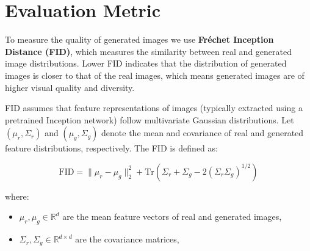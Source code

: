 




\section{Evaluation Metric}

To measure the quality of generated images we use \textbf{Fréchet Inception Distance (FID)}, which 
measures the similarity between real and generated image distributions. Lower FID indicates that the 
distribution of generated images is closer to that of the real images, which means generated images are of 
higher visual quality and diversity.

FID assumes that feature representations of images (typically extracted using a pretrained 
Inception network) follow multivariate Gaussian distributions. Let $(\mu_r, \Sigma_r)$ 
and $(\mu_g, \Sigma_g)$ denote the mean and covariance of real and generated feature distributions, 
respectively. The FID is defined as:

\begin{equation}
\text{FID} = 
\| \mu_r - \mu_g \|_2^2 
+ 
\mathrm{Tr} \left(
\Sigma_r + \Sigma_g - 2(\Sigma_r \Sigma_g)^{1/2}
\right)
\end{equation}

\noindent
where:
\begin{itemize}
    \item $\mu_r, \mu_g \in \mathbb{R}^{d}$ are the mean feature vectors of real and generated images,
    \item $\Sigma_r, \Sigma_g \in \mathbb{R}^{d \times d}$ are the covariance matrices,
\end{itemize}

